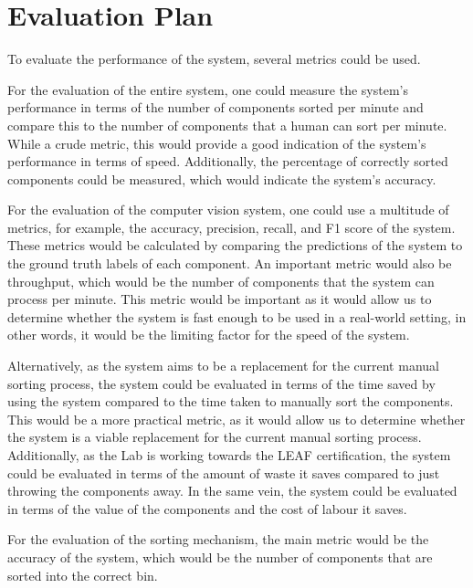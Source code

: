 \section{Evaluation Plan}
To evaluate the performance of the system, several metrics could be used.

For the evaluation of the entire system, one could measure the system's performance in terms of the number of components sorted per minute and compare
this to the number of components that a human can sort per minute. While a crude metric, this would provide a good indication of the system's performance
in terms of speed. Additionally, the percentage of correctly sorted components could be measured, which would indicate the system's accuracy.

For the evaluation of the computer vision system, one could use a multitude of metrics, for example, the accuracy, precision, recall, and F1 score of the
system. These metrics would be calculated by comparing the predictions of the system to the ground truth labels of each component. An important
metric would also be throughput, which would be the number of components that the system can process per minute. This metric would be important
as it would allow us to determine whether the system is fast enough to be used in a real-world setting, in other words, it would be the limiting factor
for the speed of the system.

Alternatively, as the system aims to be a replacement for the current manual sorting process, the system could be evaluated in terms of the time
saved by using the system compared to the time taken to manually sort the components. This would be a more practical metric, as it would allow us to
determine whether the system is a viable replacement for the current manual sorting process. Additionally, as the Lab is working towards the LEAF
certification, the system could be evaluated in terms of the amount of waste it saves compared to just throwing the components away. In the same vein,
the system could be evaluated in terms of the value of the components and the cost of labour it saves.

For the evaluation of the sorting mechanism, the main metric would be the accuracy of the system, which would be the number of components that are
sorted into the correct bin.
